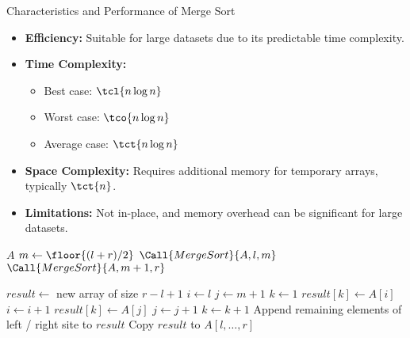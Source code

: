 \begin{properties}[]{Characteristics and Performance of Merge Sort}
    \begin{itemize}
        \item \textbf{Efficiency:} Suitable for large datasets due to its predictable time complexity.
        \item \textbf{Time Complexity:}
              \begin{itemize}
                  \item Best case: $\tcl{n \log n}$
                  \item Worst case: $\tco{n \log n}$
                  \item Average case: $\tct{n \log n}$
              \end{itemize}
        \item \textbf{Space Complexity:} Requires additional memory for temporary arrays, typically $\tct{n}$.
        \item \textbf{Limitations:} Not in-place, and memory overhead can be significant for large datasets.
    \end{itemize}
\end{properties}

\begin{algorithm}
    \begin{spacing}{1.2}
        \caption{Merge Sort}
        \begin{algorithmic}[1]
                    \State \Return $A$ 
                \EndIf
                \State $m \gets \floor{(l + r)/2}$
                \State $\Call{MergeSort}{A, l, m}$ 
                \State $\Call{MergeSort}{A, m + 1, r}$ 
                \State {}
            \EndProcedure

             
                \State $result \gets$ new array of size $r - l + 1$
                \State $i \gets l$
                \State $j \gets m + 1$
                \State $k \gets 1$
                        \State $result[k] \gets A[i]$
                        \State $i \gets i + 1$
                    \Else
                        \State $result[k] \gets A[j]$
                        \State $j \gets j + 1$
                    \EndIf
                    \State $k \gets k + 1$
                \EndWhile
                \State Append remaining elements of left / right site to $result$
                \State Copy $result$ to $A[l, \ldots, r]$
            \EndProcedure
        \end{algorithmic}
    \end{spacing}
\end{algorithm}

